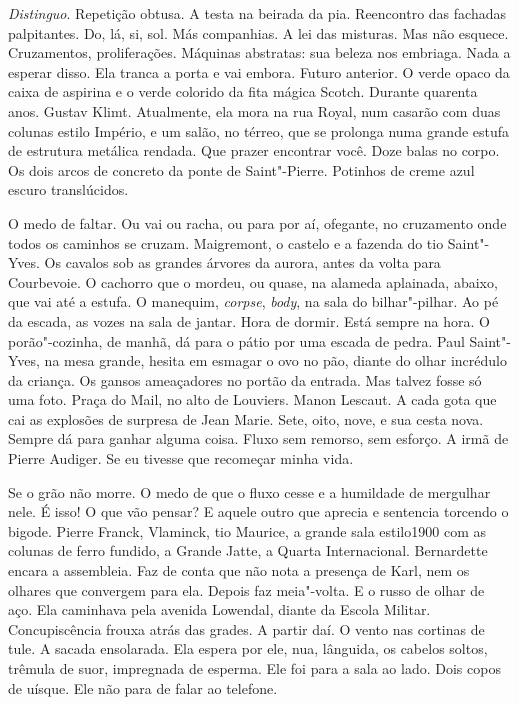 \emph{Distinguo}. Repetição obtusa. A testa na beirada da pia.
Reencontro das fachadas palpitantes. Do, lá, si, sol. Más companhias. A
lei das misturas. Mas não esquece. Cruzamentos, proliferações. Máquinas
abstratas: sua beleza nos embriaga. Nada a esperar disso. Ela tranca a
porta e vai embora. Futuro anterior. O verde opaco da caixa de aspirina
e o verde colorido da fita mágica Scotch. Durante quarenta anos. Gustav
Klimt. Atualmente, ela mora na rua Royal, num casarão com duas colunas
estilo Império, e um salão, no térreo, que se prolonga numa grande
estufa de estrutura metálica rendada. Que prazer encontrar você. Doze
balas no corpo. Os dois arcos de concreto da ponte de Saint"-Pierre.
Potinhos de creme azul escuro translúcidos.

O medo de faltar. Ou vai ou racha, ou para por aí, ofegante, no
cruzamento onde todos os caminhos se cruzam. Maigremont, o castelo e a
fazenda do tio Saint"-Yves. Os cavalos sob as grandes árvores da aurora,
antes da volta para Courbevoie. O cachorro que o mordeu, ou quase, na
alameda aplainada, abaixo, que vai até a estufa. O manequim,
\emph{corpse}, \emph{body}, na sala do bilhar"-pilhar. Ao pé da escada,
as vozes na sala de jantar. Hora de dormir. Está sempre na hora. O
porão"-cozinha, de manhã, dá para o pátio por uma escada de pedra. Paul
Saint"-Yves, na mesa grande, hesita em esmagar o ovo no pão, diante do
olhar incrédulo da criança. Os gansos ameaçadores no portão da entrada.
Mas talvez fosse só uma foto. Praça do Mail, no alto de Louviers. Manon
Lescaut. A cada gota que cai as explosões de surpresa de Jean Marie.
Sete, oito, nove, e sua cesta nova. Sempre dá para ganhar alguma coisa.
Fluxo sem remorso, sem esforço. A irmã de Pierre Audiger. Se eu tivesse
que recomeçar minha vida.

Se o grão não morre. O medo de que o fluxo cesse e a humildade de
mergulhar nele. É isso! O que vão pensar? E aquele outro que aprecia e
sentencia torcendo o bigode. Pierre Franck, Vlaminck, tio Maurice, a
grande sala estilo1900 com as colunas de ferro fundido, a Grande Jatte,
a Quarta Internacional. Bernardette encara a assembleia. Faz de conta
que não nota a presença de Karl, nem os olhares que convergem para ela.
Depois faz meia"-volta. E o russo de olhar de aço. Ela caminhava pela
avenida Lowendal, diante da Escola Militar. Concupiscência frouxa atrás
das grades. A partir daí. O vento nas cortinas de tule. A sacada
ensolarada. Ela espera por ele, nua, lânguida, os cabelos soltos,
trêmula de suor, impregnada de esperma. Ele foi para a sala ao lado.
Dois copos de uísque. Ele não para de falar ao telefone.

